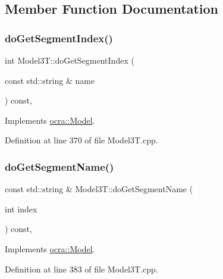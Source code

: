 \subsection{Member Function Documentation}
\hypertarget{classModel3T_aabe2edc629d42407da7b45db620854c2}{}\label{classModel3T_aabe2edc629d42407da7b45db620854c2} 
\subsubsection{\texorpdfstring{do\+Get\+Segment\+Index()}{doGetSegmentIndex()}}
{\footnotesize\ttfamily int Model3\+T\+::do\+Get\+Segment\+Index (\begin{DoxyParamCaption}\item[{const std\+::string \&}]{name }\end{DoxyParamCaption}) const\hspace{0.3cm}{\ttfamily [protected]}, {\ttfamily [virtual]}}



Implements \hyperlink{classocra_1_1Model_aede6166f1991c23db634aa5ff16b6584}{ocra\+::\+Model}.



Definition at line 370 of file Model3\+T.\+cpp.

\hypertarget{classModel3T_a1fbf30cc6c5a4abfcd9ecd574e79b866}{}\label{classModel3T_a1fbf30cc6c5a4abfcd9ecd574e79b866} 
\subsubsection{\texorpdfstring{do\+Get\+Segment\+Name()}{doGetSegmentName()}}
{\footnotesize\ttfamily const std\+::string \& Model3\+T\+::do\+Get\+Segment\+Name (\begin{DoxyParamCaption}\item[{int}]{index }\end{DoxyParamCaption}) const\hspace{0.3cm}{\ttfamily [protected]}, {\ttfamily [virtual]}}



Implements \hyperlink{classocra_1_1Model_a0f339ce01a0871a19b0f952bdda82822}{ocra\+::\+Model}.



Definition at line 383 of file Model3\+T.\+cpp.

